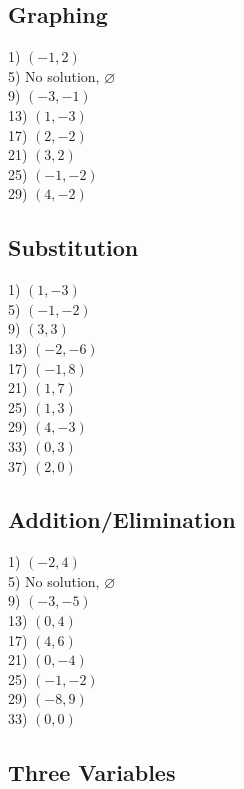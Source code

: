 \documentclass[11pt]{book}
\begin{document}
\subsection*{Graphing}

\begin{multicols}{2}
1) $(-1,2)$\\
5) No solution, $\varnothing$\\
9) $(-3,-1)$\\
13) $(1,-3)$\\
17) $(2,-2)$\\
21) $(3,2)$\\
25) $(-1,-2)$\\
29) $(4,-2)$
\end{multicols}

\subsection*{Substitution}

\begin{multicols}{2}
1) $(1,-3)$\\
5) $(-1,-2)$\\
9) $(3,3)$\\
13) $(-2,-6)$\\
17) $(-1,8)$\\
21) $(1,7)$\\
25) $(1,3)$\\
29) $(4,-3)$\\
33) $(0,3)$\\
37) $(2,0)$
\end{multicols}

\subsection*{Addition/Elimination}

\begin{multicols}{2}
1) $(-2,4)$\\
5) No solution, $\varnothing$\\
9) $(-3,-5)$\\
13) $(0,4)$\\
17) $(4,6)$\\
21) $(0,-4)$\\
25) $(-1,-2)$\\
29) $(-8,9)$\\
33) $(0,0)$
\end{multicols}

\subsection*{Three Variables}
\end{document}
